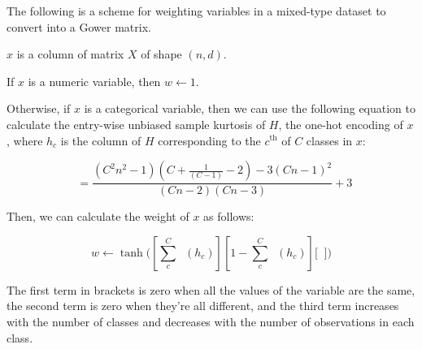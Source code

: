 \documentclass[11pt]{article}
\DeclareMathOperator{\Var}{\widehat{Var}}
\DeclareMathOperator{\Kurt}{\widehat{Kurtosis}}
\begin{document}
    The following is a scheme for weighting variables in a mixed-type dataset to convert into a Gower
    matrix.

    $x$ is a column of matrix $X$ of shape $\left(n,d\right)$.

    If $x$ is a numeric variable, then $w\leftarrow1$.

    Otherwise, if $x$ is a categorical variable, then we can use the following equation to calculate the entry-wise
    unbiased sample kurtosis of $H$, the one-hot encoding of $x$, where $h_c$ is the column of $H$ corresponding to the
    $c^{\text{th}}$ of $C$ classes in $x$:

    \begin{equation}
        \Kurt=\frac{(C^2n^2-1)(C+\frac{1}{(C-1)}-2)-3(Cn-1)^2}{(Cn-2)(Cn-3)}+3 \label{eq:kurtosis}
    \end{equation}

    Then, we can calculate the weight of $x$ as follows:

    \begin{equation}
        w\leftarrow\tanh{\Biggl(
        \left[\sum_c^C{\Var(h_c)}\right]
        \left[1-\sum_c^C{\Var(h_c)}\right]
        \Biggl[\Kurt\Biggr]\Biggr)}
        \label{eq:equation}
    \end{equation}



    The first term in brackets is zero when all the values of the variable are the same, the second term is zero when
    they're all different, and the third term increases with the number of classes and decreases with the number of
    observations in each class.
\end{document}

